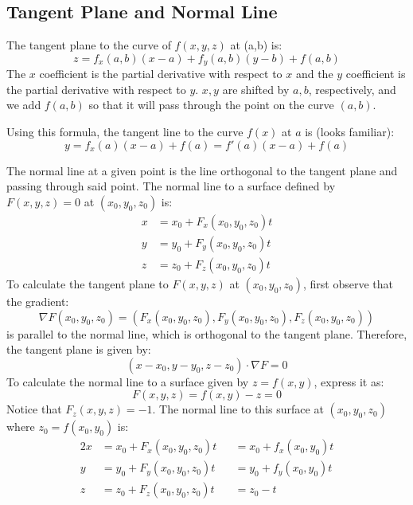 \documentclass{article}
\begin{document}
\subsection{Tangent Plane and Normal Line}

The tangent plane to the curve of $f(x,y,z)$ at (a,b) is:
\begin{equation*}
    z=f_x(a,b)(x-a)+f_y(a,b)(y-b)+f(a,b)
\end{equation*}
The $x$ coefficient is the partial derivative with respect to $x$ and the $y$ coefficient is the partial derivative with respect to $y$. $x,y$ are shifted by $a,b$, respectively, and we add $f(a,b)$ so that it will pass through the point on the curve $(a,b)$.

Using this formula, the tangent line to the curve $f(x)$ at $a$ is (looks familiar):
\begin{equation*}
    y=f_x(a)(x-a)+f(a)
	=f'(a)(x-a)+f(a)
\end{equation*}

The normal line at a given point is the line orthogonal to the tangent plane and passing through said point. The normal line to a surface defined by $F(x,y,z)=0$ at $(x_0,y_0,z_0)$ is:
\begin{align*}
	x&=x_0+F_x(x_0,y_0,z_0)t \\
	y&=y_0+F_y(x_0,y_0,z_0)t \\
	z&=z_0+F_z(x_0,y_0,z_0)t
\end{align*}
To calculate the tangent plane to $F(x,y,z)$ at $(x_0,y_0,z_0)$, first observe that the gradient:
\begin{equation*}
    \nabla F(x_0,y_0,z_0)=(F_x(x_0,y_0,z_0),F_y(x_0,y_0,z_0),F_z(x_0,y_0,z_0))
\end{equation*}
is parallel to the normal line, which is orthogonal to the tangent plane. Therefore, the tangent plane is given by:
\begin{equation*}
	(x-x_0,y-y_0,z-z_0)\cdot \nabla F=0
\end{equation*}
To calculate the normal line to a surface given by $z=f(x,y)$, express it as:
\begin{equation*}
    F(x,y,z)=f(x,y)-z=0
\end{equation*}
Notice that $F_z(x,y,z)=-1$. The normal line to this surface at $(x_0,y_0,z_0)$ where $z_0=f(x_0,y_0)$ is:
\begin{alignat*}{2}
	x&=x_0+F_x(x_0,y_0,z_0)t&&=x_0+f_x(x_0,y_0)t \\
	y&=y_0+F_y(x_0,y_0,z_0)t&&=y_0+f_y(x_0,y_0)t \\
	z&=z_0+F_z(x_0,y_0,z_0)t&&=z_0-t
\end{alignat*}
\end{document}
